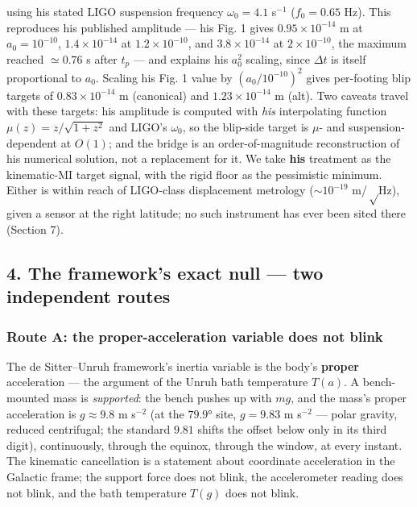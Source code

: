 \documentclass[
]{article}
\begin{document}
using his stated LIGO suspension frequency \(\omega_0 = 4.1\) s\(^{-1}\)
(\(f_0 = 0.65\) Hz). This reproduces his published amplitude --- his
Fig. 1 gives \(0.95\times10^{-14}\) m at \(a_0 = 10^{-10}\),
\(1.4\times10^{-14}\) at \(1.2\times10^{-10}\), and
\(3.8\times10^{-14}\) at \(2\times10^{-10}\), the maximum reached
\(\simeq 0.76\) s after \(t_p\) --- and explains his \(a_0^2\) scaling,
since \(\Delta t\) is itself proportional to \(a_0\). Scaling his Fig. 1
value by \((a_0/10^{-10})^2\) gives per-footing blip targets of
\(0.83\times10^{-14}\) m (canonical) and \(1.23\times10^{-14}\) m (alt).
Two caveats travel with these targets: his amplitude is computed with
\emph{his} interpolating function \(\mu(z) = z/\sqrt{1+z^2}\) and LIGO's
\(\omega_0\), so the blip-side target is \(\mu\)- and
suspension-dependent at \(O(1)\); and the bridge is an
order-of-magnitude reconstruction of his numerical solution, not a
replacement for it. We take \textbf{his} treatment as the kinematic-MI
target signal, with the rigid floor as the pessimistic minimum. Either
is within reach of LIGO-class displacement metrology (\(\sim10^{-19}\)
m/\(\sqrt\mathrm{Hz}\)), given a sensor at the right latitude; no such
instrument has ever been sited there (Section 7).

\subsection{4. The framework's exact null --- two independent
routes}\label{the-frameworks-exact-null-two-independent-routes}

\subsubsection{Route A: the proper-acceleration variable does not
blink}\label{route-a-the-proper-acceleration-variable-does-not-blink}

The de Sitter--Unruh framework's inertia variable is the body's
\textbf{proper} acceleration --- the argument of the Unruh bath
temperature \(T(a)\). A bench-mounted mass is \emph{supported}: the
bench pushes up with \(mg\), and the mass's proper acceleration is
\(g \approx 9.8\) m s\(^{-2}\) (at the \(79.9°\) site, \(g = 9.83\) m
s\(^{-2}\) --- polar gravity, reduced centrifugal; the standard \(9.81\)
shifts the offset below only in its third digit), continuously, through
the equinox, through the window, at every instant. The kinematic
cancellation is a statement about coordinate acceleration in the
Galactic frame; the support force does not blink, the accelerometer
reading does not blink, and the bath temperature \(T(g)\) does not
blink.
\end{document}
